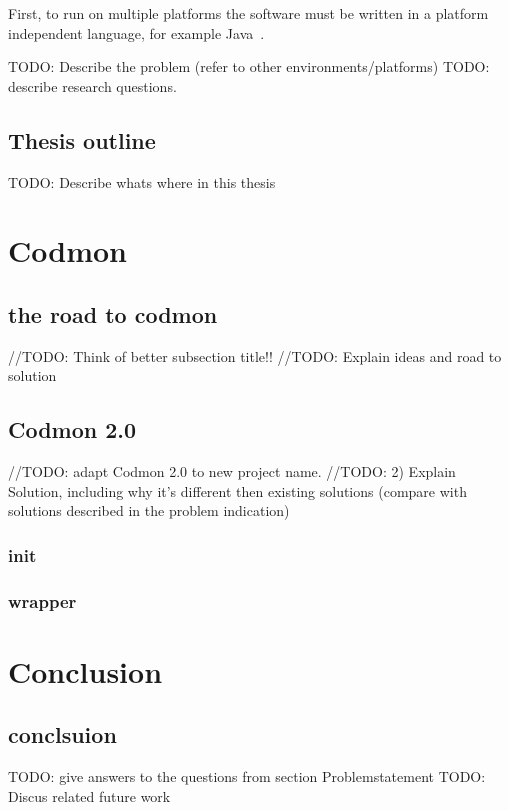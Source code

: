 \documentclass[a4paper,10pt]{scrartcl}
\begin{document}
First, to run on multiple platforms the software must be written in a
platform independent language, for example Java~\cite{Java}.


TODO: Describe the problem (refer to other environments/platforms)
TODO: describe research questions.

\subsection{Thesis outline}
\label{subsec:Thesisoutline}
TODO: Describe whats where in this thesis

\newpage

\section{Codmon}
\label{sec:codmon}

\subsection{the road to codmon}
//TODO: Think of better subsection title!!
//TODO: Explain ideas and road to solution

\subsection{Codmon 2.0}
//TODO: adapt Codmon 2.0 to new project name.
//TODO: 2) Explain Solution, including why it's different then existing solutions (compare with solutions described in the problem indication)

\subsubsection{init}
\label{subsec:init}

\subsubsection{wrapper}
\label{subsec:wrapper}

\newpage
\section{Conclusion}
\subsection{conclsuion}
TODO: give answers to the questions from section Problemstatement
TODO: Discus related future work
\newpage


\end{document}
